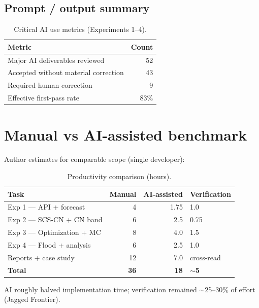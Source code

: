 \documentclass[11pt,a4paper]{article}
\begin{document}
\subsection{Prompt / output summary}
\begin{table}[htbp]
  \centering
  \caption{Critical AI use metrics (Experiments 1--4).}
  \begin{tabular}{@{}lr@{}}
    \toprule
    Metric & Count \\
    \midrule
    Major AI deliverables reviewed & 52 \\
    Accepted without material correction & 43 \\
    Required human correction & 9 \\
    Effective first-pass rate & 83\% \\
    \bottomrule
  \end{tabular}
\end{table}

\section{Manual vs AI-assisted benchmark}
Author estimates for comparable scope (single developer):
\begin{table}[htbp]
  \centering
  \caption{Productivity comparison (hours).}
  \begin{tabular}{@{}lrrl@{}}
    \toprule
    Task & Manual & AI-assisted & Verification \\
    \midrule
    Exp 1 --- API + forecast & 4 & 1.75 & 1.0 \\
    Exp 2 --- SCS-CN + CN band & 6 & 2.5 & 0.75 \\
    Exp 3 --- Optimization + MC & 8 & 4.0 & 1.5 \\
    Exp 4 --- Flood + analysis & 6 & 2.5 & 1.0 \\
    Reports + case study & 12 & 7.0 & cross-read \\
    \midrule
    \textbf{Total} & \textbf{36} & \textbf{18} & \textbf{$\sim$5} \\
    \bottomrule
  \end{tabular}
\end{table}
AI roughly halved implementation time; verification remained $\sim$25--30\% of effort (Jagged Frontier).
\end{document}
